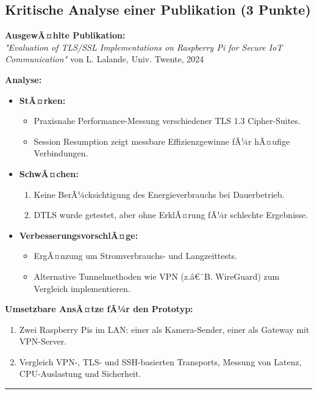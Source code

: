 ﻿\documentclass[a4paper,12pt]{article}
\begin{document}
\subsection*{Kritische Analyse einer Publikation (3 Punkte)}

\textbf{AusgewÃ¤hlte Publikation:}\\
\textit{"Evaluation of TLS/SSL Implementations on Raspberry Pi for Secure IoT Communication"} von L. Lalande, Univ. Twente, 2024

\bigskip
\textbf{Analyse:}
\begin{itemize}
    \item \textbf{StÃ¤rken:}
    \begin{itemize}
        \item Praxisnahe Performance-Messung verschiedener TLS 1.3 Cipher-Suites.
        \item Session Resumption zeigt messbare Effizienzgewinne fÃ¼r hÃ¤ufige Verbindungen.
    \end{itemize}
    \item \textbf{SchwÃ¤chen:}
    {\renewcommand{\labelenumi}{\arabic*.}%
    \begin{enumerate}
        \item Keine BerÃ¼cksichtigung des Energieverbrauchs bei Dauerbetrieb.
        \item DTLS wurde getestet, aber ohne ErklÃ¤rung fÃ¼r schlechte Ergebnisse.
    \end{enumerate}
    }
    \item \textbf{VerbesserungsvorschlÃ¤ge:}
    \begin{itemize}
        \item ErgÃ¤nzung um Stromverbrauchs- und Langzeittests.
        \item Alternative Tunnelmethoden wie VPN (z.â€¯B. WireGuard) zum Vergleich implementieren.
    \end{itemize}
\end{itemize}

\bigskip
\textbf{Umsetzbare AnsÃ¤tze fÃ¼r den Prototyp:}
\begin{enumerate}
    \item Zwei Raspberry Pis im LAN: einer als Kamera-Sender, einer als Gateway mit VPN-Server.
    \item Vergleich VPN-, TLS- und SSH-basierten Transports, Messung von Latenz, CPU-Auslastung und Sicherheit.
\end{enumerate}

\bigskip
\hrule
\bigskip
\end{document}
